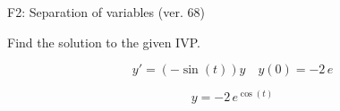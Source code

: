 \begin{exercise}
  \begin{exerciseTitle}F2: Separation of variables (ver. 68)\end{exerciseTitle}
  \begin{exerciseStatement}
    
Find the solution to the given IVP.

    
\[y'=( -\sin\left(t\right) )y\hspace{1em} y(0)= -2 \, e\]

  \end{exerciseStatement}
  \begin{exerciseAnswer}
    
\[y= -2 \, e^{\cos\left(t\right)}\]

  \end{exerciseAnswer}
\end{exercise}